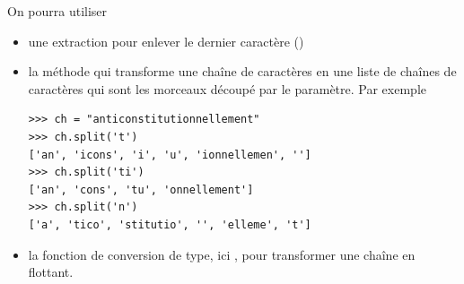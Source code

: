 On pourra utiliser
\begin{itemize}
  \item une extraction  pour enlever le dernier caractère ()
  \item la méthode  qui transforme une chaîne de caractères en une liste de chaînes de caractères qui sont les morceaux découpé par le paramètre. Par exemple
\begin{lstlisting}
>>> ch = "anticonstitutionnellement"
>>> ch.split('t')
['an', 'icons', 'i', 'u', 'ionnellemen', '']
>>> ch.split('ti')
['an', 'cons', 'tu', 'onnellement']
>>> ch.split('n')
['a', 'tico', 'stitutio', '', 'elleme', 't']
\end{lstlisting}
\item la fonction de conversion de type, ici , pour transformer une chaîne en flottant.
\end{itemize}

